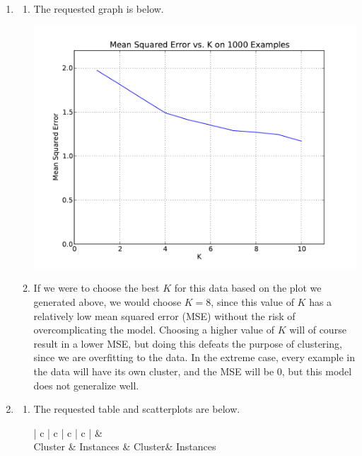 \documentclass[solution, letterpaper]{cs121}
\begin{document}
\begin{enumerate}
	\item 
		\begin{enumerate}
			\item The requested graph is below.
				\begin{center}
				\includegraphics[scale=0.8]{mse-vs-k.pdf}
				\end{center}
			\item If we were to choose the best $K$ for this data based on the plot we generated above, we would choose $K = 8$, since this value of $K$ has a relatively low mean squared error (MSE) without the risk of overcomplicating the model. Choosing a higher value of $K$ will of course result in a lower MSE, but doing this defeats the purpose of clustering, since we are overfitting to the data. In the extreme case, every example in the data will have its own cluster, and the MSE will be 0, but this model does not generalize well.
		\end{enumerate}
	\item
		\begin{enumerate}
			\item The requested table and scatterplots are below. \\
				\begin{center}  
				\begin{tabular}{| c | c | c | c | } \hline
				 &   \\    \hline         
				Cluster & Instances & Cluster& Instances  \\ \hline

\end{tabular}
\end{center}
\end{enumerate}
\end{enumerate}
\end{document}
